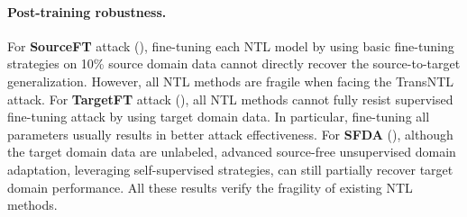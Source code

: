 \paragraph{Post-training robustness.} 
For \textbf{SourceFT} attack (), fine-tuning each NTL model by using basic fine-tuning strategies on 10\% source domain data cannot directly recover the source-to-target generalization. However, all NTL methods are fragile when facing the TransNTL attack. For \textbf{TargetFT} attack (), all NTL methods cannot fully resist supervised fine-tuning attack by using target domain data. In particular, fine-tuning all parameters usually results in better attack effectiveness. For \textbf{SFDA} (), although the target domain data are unlabeled, advanced source-free unsupervised domain adaptation, leveraging self-supervised strategies, can still partially recover target domain performance. All these results verify the fragility of existing NTL methods. 




